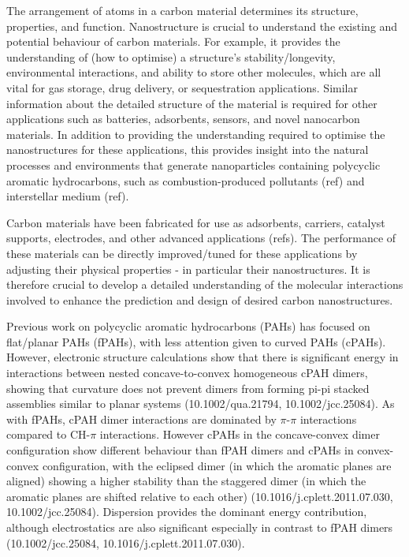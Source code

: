 The arrangement of atoms in a carbon material determines its structure, properties, and function. Nanostructure is crucial to understand the existing and potential behaviour of carbon materials. For example, it provides the understanding of (how to optimise) a structure's stability/longevity, environmental interactions, and ability to store other molecules, which are all vital for gas storage, drug delivery, or sequestration applications.  Similar information about the detailed structure of the material is required for other applications such as batteries, adsorbents, %
sensors, and novel nanocarbon materials.
In addition to providing the understanding required to optimise the nanostructures for these applications, this provides insight into the natural processes and environments that generate nanoparticles containing polycyclic aromatic hydrocarbons, such as combustion-produced pollutants (ref) and interstellar medium (ref).

Carbon materials have been fabricated for use as adsorbents, carriers, catalyst supports, electrodes, and other advanced applications (refs).  The performance of these materials can be directly improved/tuned for these applications by adjusting their physical properties - in particular their nanostructures.  It is therefore crucial to develop a detailed understanding of the molecular interactions involved to enhance the prediction and design of desired carbon nanostructures.




Previous work on polycyclic aromatic hydrocarbons (PAHs) has focused on flat/planar PAHs (fPAHs), with less attention given to curved PAHs (cPAHs). However, electronic structure calculations show that there is significant energy in interactions between nested concave-to-convex homogeneous cPAH dimers, showing that curvature does not prevent dimers from forming pi-pi stacked assemblies similar to planar systems (10.1002/qua.21794, 10.1002/jcc.25084). As with fPAHs, cPAH dimer interactions are dominated by $\pi$-$\pi$ interactions compared to CH-$\pi$ interactions. However cPAHs in the concave-convex dimer configuration show different behaviour than fPAH dimers and cPAHs in convex-convex configuration, with the eclipsed dimer (in which the aromatic planes are aligned) showing a higher stability than the staggered dimer (in which the aromatic planes are shifted relative to each other) (10.1016/j.cplett.2011.07.030, 10.1002/jcc.25084).
Dispersion provides the dominant energy contribution, although electrostatics are also significant especially in contrast to fPAH dimers (10.1002/jcc.25084, 10.1016/j.cplett.2011.07.030). 

